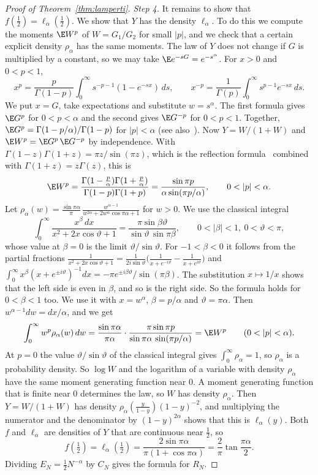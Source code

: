 \begin{proof}[Proof of Theorem~\ref{thm:lamperti}]
\emph{Step 4.} It remains to show that $f(\frac12)=\ell_\alpha(\frac12)$. We show that
$Y$ has the density $\ell_\alpha$. To do this we compute the moments $\E W^p$ of
$W=G_1/G_2$ for small $\lvert p\rvert$, and we check that a certain explicit density
$\rho_\alpha$ has the same moments. The law of $Y$ does not change if $G$ is multiplied
by a constant, so we may take $\E e^{-sG}=e^{-s^\alpha}$. For $x>0$ and $0<p<1$,
\[
x^p=\frac p{\Gamma(1-p)}\int_0^\infty s^{-p-1}(1-e^{-sx})\,ds,\qquad
x^{-p}=\frac1{\Gamma(p)}\int_0^\infty s^{p-1}e^{-sx}\,ds .
\]
We put $x=G$, take expectations and substitute $w=s^\alpha$. The first formula gives
$\E G^p$ for $0<p<\alpha$ and the second gives $\E G^{-p}$ for $0<p<1$. Together,
$\E G^p=\Gamma(1-p/\alpha)/\Gamma(1-p)$ for $\lvert p\rvert<\alpha$ (see
also~\cite[Theorem~2.6.3]{zolotarev1986}). Now $Y=W/(1+W)$ and $\E W^p=\E G^p\,\E G^{-p}$
by independence. With $\Gamma(1-z)\Gamma(1+z)=\pi z/\sin(\pi z)$, which is the
reflection formula~\cite[5.5.3]{dlmf} combined with $\Gamma(1+z)=z\Gamma(z)$, this is
\[
\E W^p=\frac{\Gamma(1-\frac p\alpha)\Gamma(1+\frac p\alpha)}{\Gamma(1-p)\Gamma(1+p)}
=\frac{\sin\pi p}{\alpha\sin(\pi p/\alpha)},\qquad0<\lvert p\rvert<\alpha .
\]
Let
$\rho_\alpha(w)=\frac{\sin\pi\alpha}\pi\,\frac{w^{\alpha-1}}{w^{2\alpha}+2w^\alpha\cos\pi\alpha+1}$
for $w>0$. We use the classical integral
\[
\int_0^\infty\frac{x^\beta\,dx}{x^2+2x\cos\vartheta+1}
=\frac{\pi\sin\beta\vartheta}{\sin\vartheta\,\sin\pi\beta},
\qquad0<\lvert\beta\rvert<1,\ 0<\vartheta<\pi,
\]
whose value at $\beta=0$ is the limit $\vartheta/\sin\vartheta$. For $-1<\beta<0$ it follows
from the partial fractions
$\frac1{x^2+2x\cos\vartheta+1}=\frac1{2i\sin\vartheta}\bigl(\frac1{x+e^{-i\vartheta}}-\frac1{x+e^{i\vartheta}}\bigr)$
and
$\int_0^\infty x^\beta(x+e^{\pm i\vartheta})^{-1}dx=-\pi e^{\pm i\beta\vartheta}/\sin(\pi\beta)$.
The substitution $x\mapsto1/x$ shows that the left side is even in $\beta$, and so is the
right side. So the formula holds for $0<\beta<1$ too. We use it with $x=w^\alpha$,
$\beta=p/\alpha$ and $\vartheta=\pi\alpha$. Then $w^{\alpha-1}dw=dx/\alpha$, and we get
\[
\int_0^\infty w^p\rho_\alpha(w)\,dw
=\frac{\sin\pi\alpha}{\pi\alpha}\cdot\frac{\pi\sin\pi p}{\sin\pi\alpha\,\sin(\pi p/\alpha)}
=\E W^p\qquad(0<\lvert p\rvert<\alpha).
\]
At $p=0$ the value $\vartheta/\sin\vartheta$ of the classical integral gives
$\int_0^\infty\rho_\alpha=1$, so $\rho_\alpha$ is a probability density. So $\log W$ and the
logarithm of a variable with density $\rho_\alpha$ have the same moment generating
function near $0$. A moment generating function that is finite near $0$ determines the
law, so $W$ has density $\rho_\alpha$. Then $Y=W/(1+W)$ has density
$\rho_\alpha(\frac y{1-y})(1-y)^{-2}$, and multiplying the numerator and the denominator
by $(1-y)^{2\alpha}$ shows that this is $\ell_\alpha(y)$. Both $f$ and $\ell_\alpha$ are
densities of $Y$ that are continuous near $\frac12$, so
\[
f(\tfrac12)=\ell_\alpha(\tfrac12)=\frac{2\sin\pi\alpha}{\pi(1+\cos\pi\alpha)}
=\frac2\pi\tan\frac{\pi\alpha}2 .
\]
Dividing $E_N=\frac12N^{-\alpha}$ by $C_N$ gives the formula for $R_N$.
\end{proof}
